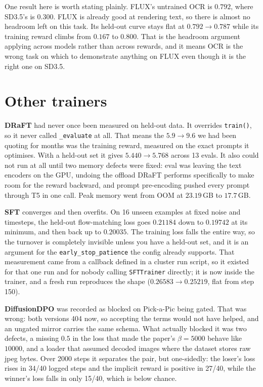 \documentclass[11pt]{article}
\newcommand{\code}[1]{\texttt{\small #1}}
\begin{document}
One result here is worth stating plainly. FLUX's untrained OCR is $0.792$, where SD3.5's is $0.300$. FLUX is already good at rendering text, so there is almost no headroom left on this task. Its held-out curve stays flat at $0.792 \to 0.787$ while its training reward climbs from $0.167$ to $0.800$. That is the headroom argument applying across models rather than across rewards, and it means OCR is the wrong task on which to demonstrate anything on FLUX even though it is the right one on SD3.5.

\section{Other trainers}

\textbf{DRaFT} had never once been measured on held-out data. It overrides \code{train()}, so it never called \code{\_evaluate} at all. That means the $5.9 \to 9.6$ we had been quoting for months was the training reward, measured on the exact prompts it optimises. With a held-out set it gives $5.440 \to 5.768$ across 13 evals. It also could not run at all until two memory defects were fixed: eval was leaving the text encoders on the GPU, undoing the offload DRaFT performs specifically to make room for the reward backward, and prompt pre-encoding pushed every prompt through T5 in one call. Peak memory went from OOM at $23.19$\,GB to $17.7$\,GB.

\textbf{SFT} converges and then overfits. On 16 unseen examples at fixed noise and timesteps, the held-out flow-matching loss goes $0.21184$ down to $0.19742$ at its minimum, and then back up to $0.20035$. The training loss falls the entire way, so the turnover is completely invisible unless you have a held-out set, and it is an argument for the \code{early\_stop\_patience} the config already supports. That measurement came from a callback defined in a cluster run script, so it existed for that one run and for nobody calling \code{SFTTrainer} directly; it is now inside the trainer, and a fresh run reproduces the shape ($0.26583 \to 0.25219$, flat from step 150).

\textbf{DiffusionDPO} was recorded as blocked on Pick-a-Pic being gated. That was wrong: both versions 404 now, so accepting the terms would not have helped, and an ungated mirror carries the same schema. What actually blocked it was two defects, a missing $0.5$ in the loss that made the paper's $\beta=5000$ behave like $10000$, and a loader that assumed decoded images where the dataset stores raw jpeg bytes. Over 2000 steps it separates the pair, but one-sidedly: the loser's loss rises in 34/40 logged steps and the implicit reward is positive in 27/40, while the winner's loss falls in only 15/40, which is below chance.
\end{document}
